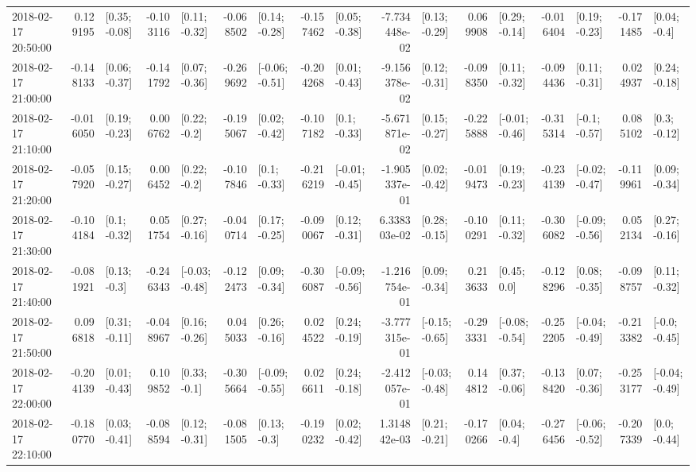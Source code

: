 \begin{tabular}{lrlrlrlrlrlrlrlrl}
2018-02-17 20:50:00 &  0.129195 &   [0.35; -0.08] & -0.103116 &   [0.11; -0.32] & -0.068502 &   [0.14; -0.28] & -0.157462 &   [0.05; -0.38] & -7.734448e-02 &   [0.13; -0.29] &  0.069908 &   [0.29; -0.14] & -0.016404 &   [0.19; -0.23] & -0.171485 &    [0.04; -0.4] \\
2018-02-17 21:00:00 & -0.148133 &   [0.06; -0.37] & -0.141792 &   [0.07; -0.36] & -0.269692 &  [-0.06; -0.51] & -0.204268 &   [0.01; -0.43] & -9.156378e-02 &   [0.12; -0.31] & -0.098350 &   [0.11; -0.32] & -0.094436 &   [0.11; -0.31] &  0.024937 &   [0.24; -0.18] \\
2018-02-17 21:10:00 & -0.016050 &   [0.19; -0.23] &  0.006762 &    [0.22; -0.2] & -0.195067 &   [0.02; -0.42] & -0.107182 &    [0.1; -0.33] & -5.671871e-02 &   [0.15; -0.27] & -0.225888 &  [-0.01; -0.46] & -0.315314 &   [-0.1; -0.57] &  0.085102 &    [0.3; -0.12] \\
2018-02-17 21:20:00 & -0.057920 &   [0.15; -0.27] &  0.006452 &    [0.22; -0.2] & -0.107846 &    [0.1; -0.33] & -0.216219 &  [-0.01; -0.45] & -1.905337e-01 &   [0.02; -0.42] & -0.019473 &   [0.19; -0.23] & -0.234139 &  [-0.02; -0.47] & -0.119961 &   [0.09; -0.34] \\
2018-02-17 21:30:00 & -0.104184 &    [0.1; -0.32] &  0.051754 &   [0.27; -0.16] & -0.040714 &   [0.17; -0.25] & -0.090067 &   [0.12; -0.31] &  6.338303e-02 &   [0.28; -0.15] & -0.100291 &   [0.11; -0.32] & -0.306082 &  [-0.09; -0.56] &  0.052134 &   [0.27; -0.16] \\
2018-02-17 21:40:00 & -0.081921 &    [0.13; -0.3] & -0.246343 &  [-0.03; -0.48] & -0.122473 &   [0.09; -0.34] & -0.306087 &  [-0.09; -0.56] & -1.216754e-01 &   [0.09; -0.34] &  0.213633 &     [0.45; 0.0] & -0.128296 &   [0.08; -0.35] & -0.098757 &   [0.11; -0.32] \\
2018-02-17 21:50:00 &  0.096818 &   [0.31; -0.11] & -0.048967 &   [0.16; -0.26] &  0.045033 &   [0.26; -0.16] &  0.024522 &   [0.24; -0.19] & -3.777315e-01 &  [-0.15; -0.65] & -0.293331 &  [-0.08; -0.54] & -0.252205 &  [-0.04; -0.49] & -0.213382 &   [-0.0; -0.45] \\
2018-02-17 22:00:00 & -0.204139 &   [0.01; -0.43] &  0.109852 &    [0.33; -0.1] & -0.305664 &  [-0.09; -0.55] &  0.026611 &   [0.24; -0.18] & -2.412057e-01 &  [-0.03; -0.48] &  0.144812 &   [0.37; -0.06] & -0.138420 &   [0.07; -0.36] & -0.253177 &  [-0.04; -0.49] \\
2018-02-17 22:10:00 & -0.180770 &   [0.03; -0.41] & -0.088594 &   [0.12; -0.31] & -0.081505 &    [0.13; -0.3] & -0.190232 &   [0.02; -0.42] &  1.314842e-03 &   [0.21; -0.21] & -0.170266 &    [0.04; -0.4] & -0.276456 &  [-0.06; -0.52] & -0.207339 &    [0.0; -0.44] \\

\end{tabular}
